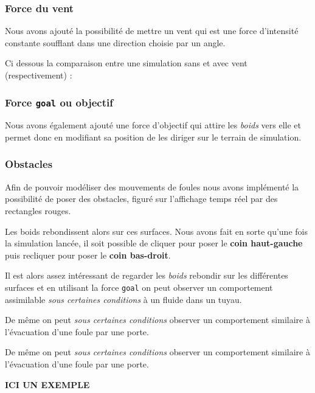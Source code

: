 \documentclass[
]{article}
\begin{document}
\hypertarget{force-du-vent}{%
\subsubsection{Force du vent}\label{force-du-vent}}

Nous avons ajouté la possibilité de mettre un vent qui est une force
d'intensité constante soufflant dans une direction choisie par un angle.

Ci dessous la comparaison entre une simulation sans et avec vent
(respectivement) :

\hypertarget{force-goal-ou-objectif}{%
\subsubsection{\texorpdfstring{Force \texttt{goal} ou
objectif}{Force goal ou objectif}}\label{force-goal-ou-objectif}}

Nous avons également ajouté une force d'objectif qui attire les
\emph{boids} vers elle et permet donc en modifiant sa position de les
diriger sur le terrain de simulation.

\hypertarget{obstacles}{%
\subsubsection{Obstacles}\label{obstacles}}

Afin de pouvoir modéliser des mouvements de foules nous avons implémenté
la possibilité de poser des obstacles, figuré sur l'affichage temps réel
par des rectangles rouges.

Les boids rebondissent alors sur ces surfaces. Nous avons fait en sorte
qu'une fois la simulation lancée, il soit possible de cliquer pour poser
le \textbf{coin haut-gauche} puis recliquer pour poser le \textbf{coin
bas-droit}.

Il est alors assez intéressant de regarder les \emph{boids} rebondir sur
les différentes surfaces et en utilisant la force \texttt{goal} on peut
observer un comportement assimilable \emph{sous certaines conditions} à
un fluide dans un tuyau.

De même on peut \emph{sous certaines conditions} observer un
comportement similaire à l'évacuation d'une foule par une porte.

De même on peut \emph{sous certaines conditions} observer un
comportement similaire à l'évacuation d'une foule par une porte.

\textbf{ICI UN EXEMPLE}
\end{document}
